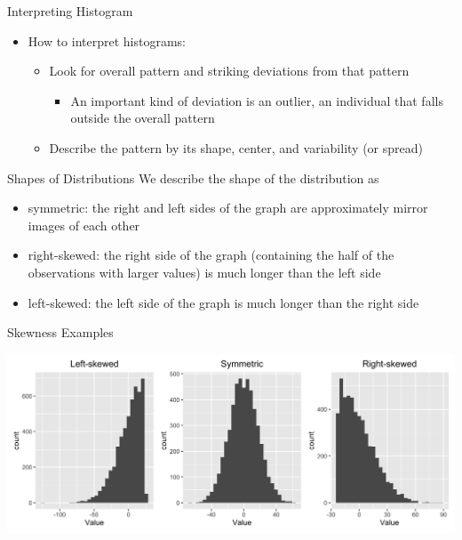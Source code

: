 \documentclass{beamer}
\begin{document}
\begin{frame}{Interpreting Histogram}
    \begin{itemize}
        \item How to interpret histograms:
        \begin{itemize}
            \item Look for overall pattern and striking deviations from that pattern
            \begin{itemize}
                \item An important kind of deviation is an outlier, an individual that falls outside the overall pattern
            \end{itemize}
            \item Describe the pattern by its shape, center, and variability (or spread)
        \end{itemize}
    \end{itemize}
\end{frame}

\begin{frame}{Shapes of Distributions}
    We describe the shape of the distribution as
    \begin{itemize}
        \item \alert{symmetric}: the right and left sides of the graph are approximately mirror images of each other
        \item \alert{right-skewed}: the right side of the graph (containing the half of the observations with larger values) is much longer than the left side
        \item \alert{left-skewed}: the left side of the graph is much longer than the right side 
    \end{itemize}
\end{frame}

\begin{frame}{Skewness Examples}
    \begin{center}
        \includegraphics[width= \linewidth]{skew_plots.png}
    \end{center}
\end{frame}
\end{document}
